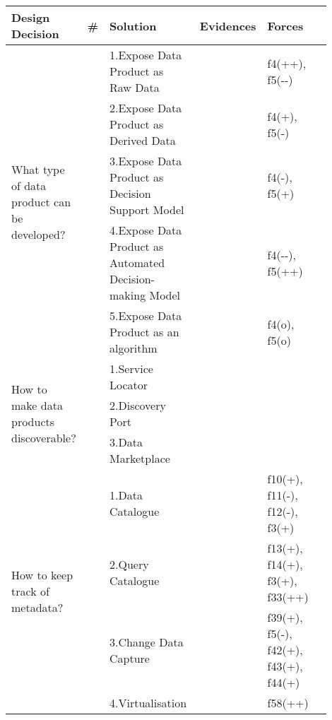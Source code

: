 \begin{tabular}{|p{0.12\linewidth}|p{0.015\linewidth}|p{0.3\linewidth}|p{0.15\linewidth}|p{0.31\linewidth}|}
\hline
{\bf Design Decision} & {\bf \#} & {\bf Solution} & {\bf Evidences} & {\bf Forces}\\
\hline
\multirow{5}{\linewidth}{What type of data product can be developed?} &\cellcolor{emerald_shape_3}{} &1.Expose Data Product as Raw Data&\cellcolor{emerald_shape_7}{s1, s2, s6, s7, s9, s14, s15, s27, s34, s43} & f4(++), f5(-{}-)\\
 & \cellcolor{emerald_shape_3}{} & 2.Expose Data Product as Derived Data&\cellcolor{emerald_shape_7}{s1, s2, s6, s9, s14, s15, s27, s34} & f4(+), f5(-)\\
 & \cellcolor{emerald_shape_3}{} & 3.Expose Data Product as Decision Support Model&\cellcolor{emerald_shape_7}{s1, s2, s6, s7, s9, s14, s27, s34} & f4(-), f5(+)\\
 & \cellcolor{emerald_shape_3}{} & 4.Expose Data Product as Automated Decision-making Model&\cellcolor{emerald_shape_6}{s1, s2, s6, s9, s27, s34} & f4(-{}-), f5(++)\\
 & \multirow{-5}{\linewidth}{ \cellcolor{emerald_shape_3}{10}} &5.Expose Data Product as an algorithm&\cellcolor{emerald_shape_4}{s2, s6} & f4(o), f5(o)\\
\multirow{3}{\linewidth}{How to make data products discoverable?} &\cellcolor{emerald_shape_5}{} &1.Service Locator&\cellcolor{emerald_shape_2}{s1, s32} & \\
 & \cellcolor{emerald_shape_5}{} & 2.Discovery Port&\cellcolor{emerald_shape_3}{s20, s25, s49, s52} & \\
 & \multirow{-3}{\linewidth}{ \cellcolor{emerald_shape_5}{21}} &3.Data Marketplace&\cellcolor{emerald_shape_4}{s14, s32, s42, s43, s45} & \\
\multirow{6}{\linewidth}{How to keep track of metadata?} &\cellcolor{emerald_shape_7}{} &1.Data Catalogue&\cellcolor{emerald_shape_5}{s1, s3, s5, s7, s9, s15, s16, s25, s30, s31, s32, s37, s43, s48, s53} & f10(+), f11(-), f12(-), f3(+)\\
 & \cellcolor{emerald_shape_7}{} & 2.Query Catalogue&\cellcolor{emerald_shape_3}{s1, s3, s9, s14, s30, s32, s43} & f13(+), f14(+), f3(+), f33(++)\\
 & \cellcolor{emerald_shape_7}{} & 3.Change Data Capture&\cellcolor{emerald_shape_4}{s4, s17, s20, s38, s45, s48, s53, s54} & f39(+), f5(-), f42(+), f43(+), f44(+)\\
 & \cellcolor{emerald_shape_7}{} & 4.Virtualisation&\cellcolor{emerald_shape_4}{s4, s14, s15, s18, s19, s20, s46, s49} & f58(++)\\

\end{tabular}
